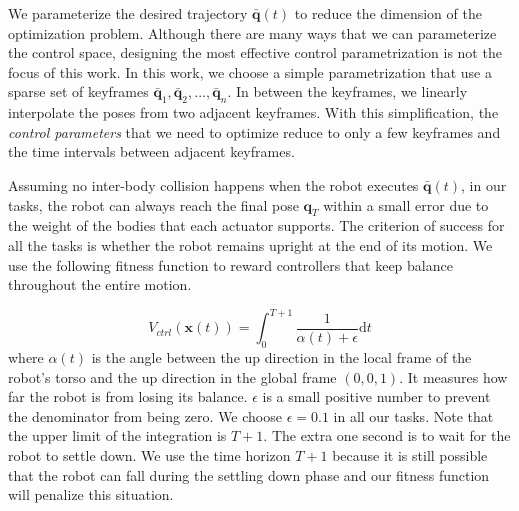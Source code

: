 We parameterize the desired trajectory $\bar{\mathbf{q}}(t)$ to reduce the dimension of the optimization problem. Although there are many ways that we can parameterize the control space, designing the most effective control parametrization is not the focus of this work. In this work, we choose a simple parametrization that use a sparse set of keyframes $\bar{\mathbf{q}}_1, \bar{\mathbf{q}}_2, ..., \bar{\mathbf{q}}_n$. In between the keyframes, we linearly interpolate the poses from two adjacent keyframes. With this simplification, the \emph{control parameters} that we need to optimize reduce to only a few keyframes and the time intervals between adjacent keyframes. 

Assuming no inter-body collision happens when the robot executes $\bar{\mathbf{q}}(t)$, in our tasks, the robot can always reach the final pose $\mathbf{q}_T$ within a small error due to the weight of the bodies that each actuator supports. The criterion of success for all the tasks is whether the robot remains upright at the end of its motion. We use the following fitness function to reward controllers that keep balance throughout the entire motion.

\begin{equation}
  V_{ctrl}(\mathbf{x}(t))=\int_0^{T+1} \frac{1}{\alpha(t)+\epsilon}\mathrm{d}t
  \label{eqn:controllerObj}
\end{equation}
where $\alpha(t)$ is the angle between the up direction in the local frame of the robot's torso and the up direction in the global frame $(0,0,1)$. It measures how far the robot is from losing its balance. $\epsilon$ is a small positive number to prevent the denominator from being zero. We choose $\epsilon=0.1$ in all our tasks. Note that the upper limit of the integration is $T+1$. The extra one second is to wait for the robot to settle down. We use the time horizon $T+1$ because it is still possible that the robot can fall during the settling down phase and our fitness function will penalize this situation.

